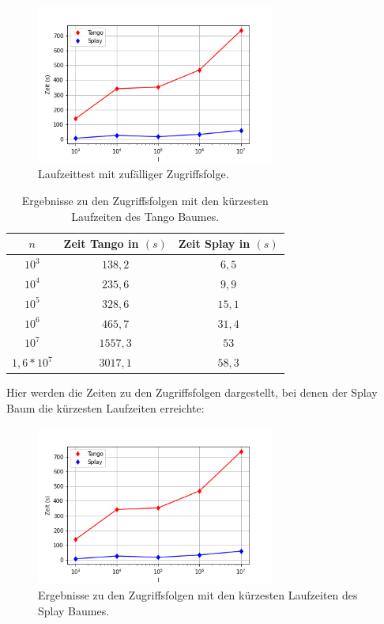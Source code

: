 \documentclass[a4paper,12pt]{article}
\begin{document}
\begin{figure}[H]
	\centering
	\includegraphics[width=0.7\textwidth]{Medien/laufzeittest/diagramm/randomaccess}
	\caption{Laufzeittest mit zufälliger Zugriffsfolge.}
 	
\end{figure}
\begin{table}[H]
	\begin{center}
		\begin{tabular}[c]{|c|c|c|}
			\hline
			$n$ & Zeit Tango in $\left(s\right)$ &Zeit Splay in $\left(s\right)$ \\
			\hline
			$10^3$ & $138,2$ &$6,5$ \\
			\hline
			$10^4$  & $235,6$ &$9,9$  \\
			\hline
			$10^5$  & $328,6$ &$15,1$  \\
			\hline
			$10^6$  & $465,7$ &$31,4$  \\
			\hline
			$10^7$  & $1557,3$ &$53$  \\
			\hline
			$1,6 * 10^7$  & $3017,1$ &$58,3$  \\
			\hline
		\end{tabular}
		\caption{Ergebnisse zu den Zugriffsfolgen mit den kürzesten Laufzeiten des Tango Baumes.} 
	\end{center}
\end{table}
\noindent	Hier werden die Zeiten zu den Zugriffsfolgen dargestellt, bei denen der Splay Baum die kürzesten  Laufzeiten erreichte:
\begin{figure}[H]
	\centering
	\includegraphics[width=0.7\textwidth]{Medien/laufzeittest/diagramm/randomaccess}
	\caption{Ergebnisse zu den Zugriffsfolgen mit den kürzesten Laufzeiten des Splay Baumes.}
	
\end{figure}
\end{document}
